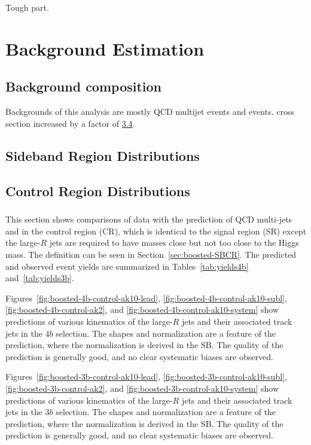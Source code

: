 \begin{savequote}[75mm]
Tough part.
\end{savequote}

\chapter{Background Estimation}

\section{Background composition}
Backgrounds of this analysis are mostly QCD multijet events and \ttbar events. \ttbar cross section increased by a factor of \href{https://cds.cern.ch/record/2227057/files/STDM-2016-02-02.pdf}{3.4}.


\section{Sideband Region Distributions}


\section{Control Region Distributions}

\paragraph{}
This section shows comparisons of data with the prediction of QCD multi-jets and \ttbar in the control region (CR), which is identical to the signal region (SR) except the large-$R$ jets are required to have masses close but not too close to the Higgs mass. The definition can be seen in Section~\ref{sec:boosted-SBCR}. The predicted and observed event yields are summarized in Tables~\ref{tab:yields4b} and~\ref{tab:yields3b}.

Figures~\ref{fig:boosted-4b-control-ak10-lead}, \ref{fig:boosted-4b-control-ak10-subl}, \ref{fig:boosted-4b-control-ak2}, and \ref{fig:boosted-4b-control-ak10-system} show predictions of various kinematics of the large-$R$ jets and their associated track jets in the 4$b$ selection. The shapes and normalization are a feature of the prediction, where the normalization is derived in the SB. The quality of the prediction is generally good, and no clear systematic biases are observed.

Figures~\ref{fig:boosted-3b-control-ak10-lead}, \ref{fig:boosted-3b-control-ak10-subl}, \ref{fig:boosted-3b-control-ak2},  and \ref{fig:boosted-3b-control-ak10-system} show predictions of various kinematics of the large-$R$ jets and their associated track jets in the 3$b$ selection. The shapes and normalization are a feature of the prediction, where the normalization is derived in the SB. The quality of the prediction is generally good, and no clear systematic biases are observed.

